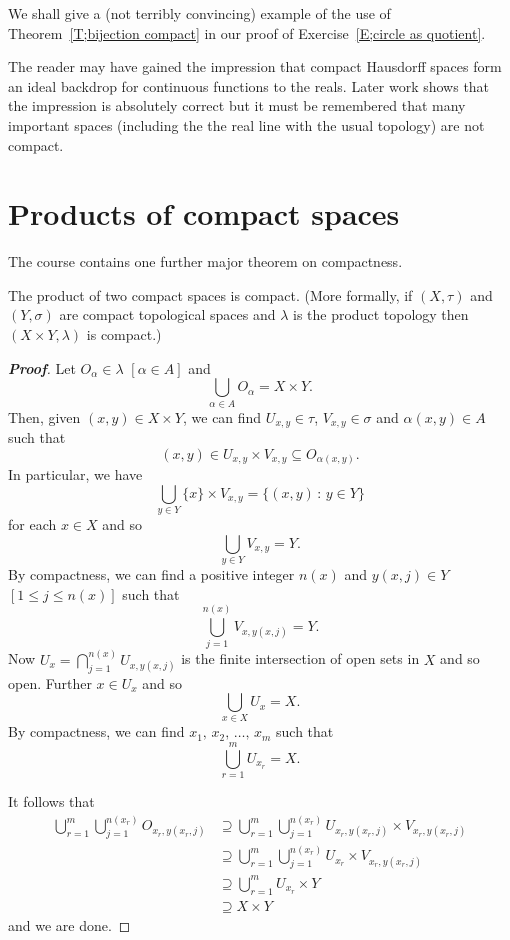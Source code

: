 We shall give a (not terribly convincing) example 
of the use of Theorem~\ref{T;bijection compact}
in our proof of Exercise~\ref{E;circle as quotient}.

The reader may have gained the impression that
compact Hausdorff spaces form an ideal backdrop
for continuous functions to the reals.
Later work shows that the impression is
absolutely correct
but it must be remembered that many important
spaces (including the the real line with the usual topology)
are not compact. 




















\section{Products of compact spaces} The course contains one 
further major theorem on compactness.

\begin{theorem}\label{T;product compact} 
The product of two compact spaces is compact. (More formally, if $(X,\tau)$ and $(Y,\sigma)$ are compact topological spaces and $\lambda$ is the product topology then $(X\times Y,\lambda)$ is compact.)
\end{theorem}
\begin{proof}[\bf Proof] Let $O_{\alpha}\in\lambda$ $[\alpha\in A]$ and
\[\bigcup_{\alpha\in A}O_{\alpha}=X\times Y.\]
Then, given $(x,y)\in X\times Y$, we can find
$U_{x,y}\in\tau$, $V_{x,y}\in\sigma$ and $\alpha(x,y)\in A$ such
that
\[(x,y)\in U_{x,y}\times V_{x,y}\subseteq O_{\alpha(x,y)}.\]
In particular, we have
\[\bigcup_{y\in Y}\{x\}\times V_{x,y}=\{(x,y)\,:\,y\in Y\}\]
for each $x\in X$ and so
\[\bigcup_{y\in Y}V_{x,y}=Y.\]
By compactness, we can find a positive
integer $n(x)$ and $y(x,j)\in Y$ $[1\leq j\leq n(x)]$
such that
\[\bigcup_{j=1}^{n(x)}V_{x,y(x,j)}=Y.\]
Now $U_{x}=\bigcap_{j=1}^{n(x)}U_{x,y(x,j)}$ is the finite intersection
of open sets in $X$ and so open. Further $x\in U_{x}$ and so
\[\bigcup_{x\in X}U_{x}=X.\]
By compactness, we can find $x_{1},\,x_{2},\,\dots,\,x_{m}$ such that
\[\bigcup_{r=1}^{m}U_{x_{r}}=X.\]

It follows that
\begin{align*}
\bigcup_{r=1}^{m}\bigcup_{j=1}^{n(x_{r})}O_{x_{r},y(x_{r},j)}
&\supseteq \bigcup_{r=1}^{m}
\bigcup_{j=1}^{n(x_{r})}U_{x_{r},y(x_{r},j)}\times V_{x_{r},y(x_{r},j)}\\
&\supseteq \bigcup_{r=1}^{m}\bigcup_{j=1}^{n(x_{r})}
U_{x_{r}}\times V_{x_{r},y(x_{r},j)}\\
&\supseteq \bigcup_{r=1}^{m}U_{x_{r}}\times Y\\
&\supseteq X\times Y
\end{align*}
and we are done.
\end{proof}


